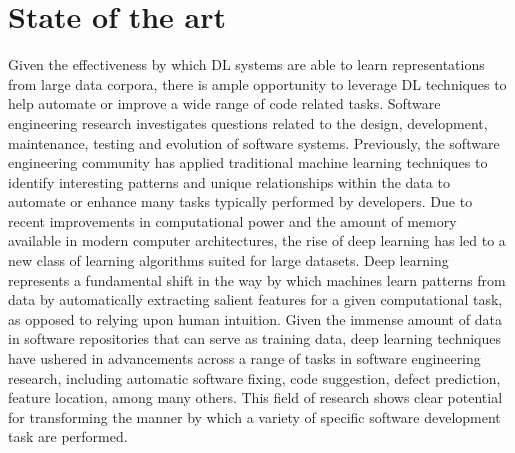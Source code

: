 \section{State of the art}
Given the effectiveness by which DL systems are able to learn representations from large data corpora, there is 
ample opportunity to leverage DL techniques to help automate or improve a wide range of code related tasks. 
Software engineering research investigates questions related to the design, development, maintenance, testing and evolution 
of software systems. Previously, the software engineering community has applied traditional machine learning 
techniques to identify interesting patterns and unique relationships within the data to automate or enhance many tasks typically 
performed by developers. Due to recent improvements in computational power and the amount of memory available 
in modern computer architectures, the rise of deep learning has led to a new class of learning algorithms suited for large datasets.
Deep learning represents a fundamental shift in the way by which machines learn patterns from data by automatically extracting salient features
for a given computational task, as opposed to relying upon human intuition. Given the immense amount of data in software repositories that 
can serve as training data, deep learning techniques have ushered in advancements across a range of tasks in software engineering research, including
automatic software fixing, code suggestion, defect prediction, feature location, among many others. This field of research shows clear potential for
transforming the manner by which a variety of specific software development task are performed.

